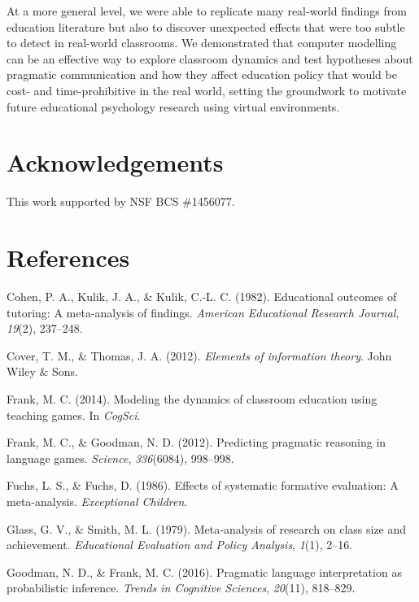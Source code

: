 \documentclass[10pt, letterpaper]{apa6}
\begin{document}
At a more general level, we were able to replicate many real-world
findings from education literature but also to discover unexpected
effects that were too subtle to detect in real-world classrooms. We
demonstrated that computer modelling can be an effective way to explore
classroom dynamics and test hypotheses about pragmatic communication and
how they affect education policy that would be cost- and
time-prohibitive in the real world, setting the groundwork to motivate
future educational psychology research using virtual environments.

\section{Acknowledgements}\label{acknowledgements}

This work supported by NSF BCS \#1456077.

\section{References}\label{references}

\setlength{\parindent}{-0.1in} \setlength{\leftskip}{0.125in} \noindent

\hypertarget{refs}{}
\hypertarget{ref-cohen1982}{}
Cohen, P. A., Kulik, J. A., \& Kulik, C.-L. C. (1982). Educational
outcomes of tutoring: A meta-analysis of findings. \emph{American
Educational Research Journal}, \emph{19}(2), 237--248.

\hypertarget{ref-cover2012}{}
Cover, T. M., \& Thomas, J. A. (2012). \emph{Elements of information
theory}. John Wiley \& Sons.

\hypertarget{ref-frank2014}{}
Frank, M. C. (2014). Modeling the dynamics of classroom education using
teaching games. In \emph{CogSci}.

\hypertarget{ref-frank2012}{}
Frank, M. C., \& Goodman, N. D. (2012). Predicting pragmatic reasoning
in language games. \emph{Science}, \emph{336}(6084), 998--998.

\hypertarget{ref-fuchs1986}{}
Fuchs, L. S., \& Fuchs, D. (1986). Effects of systematic formative
evaluation: A meta-analysis. \emph{Exceptional Children}.

\hypertarget{ref-glass1979}{}
Glass, G. V., \& Smith, M. L. (1979). Meta-analysis of research on class
size and achievement. \emph{Educational Evaluation and Policy Analysis},
\emph{1}(1), 2--16.

\hypertarget{ref-goodman2016}{}
Goodman, N. D., \& Frank, M. C. (2016). Pragmatic language
interpretation as probabilistic inference. \emph{Trends in Cognitive
Sciences}, \emph{20}(11), 818--829.
\end{document}
